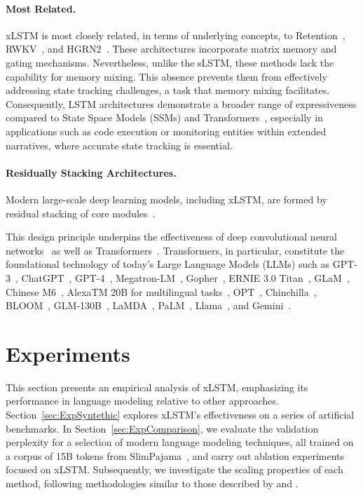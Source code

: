 \paragraph{Most Related.} xLSTM is most closely related, in terms of underlying concepts, to Retention~\citep{Sun:23arxiv}, RWKV~\citep{Peng:23arxivshort,Peng:24arxivshort}, and HGRN2~\citep{Qin:24arxiv}. These architectures incorporate matrix memory and gating mechanisms. Nevertheless, unlike the sLSTM, these methods lack the capability for memory mixing. This absence prevents them from effectively addressing state tracking challenges, a task that memory mixing facilitates. Consequently, LSTM architectures demonstrate a broader range of expressiveness compared to State Space Models (SSMs) and Transformers~\citep{Merrill:24,Deletang:23}, especially in applications such as code execution or monitoring entities within extended narratives, where accurate state tracking is essential.

\paragraph{Residually Stacking Architectures.} Modern large-scale deep learning models, including xLSTM, are formed by residual stacking of core modules~\citep{Srivastava:15,He:16}.

This design principle underpins the effectiveness of deep convolutional neural networks~\citep{He:16} as well as Transformers~\citep{Vaswani:17}. Transformers, in particular, constitute the foundational technology of today’s Large Language Models (LLMs) such as GPT-3~\citep{Brown:20short}, ChatGPT~\citep{Schulman:22short}, GPT-4~\citep{Achiam:23gpt4short}, Megatron-LM~\citep{Shoeybi:19}, Gopher~\citep{Rae:21short}, ERNIE 3.0 Titan~\citep{Wang:21arxivshort}, GLaM~\citep{Du:21glamshort}, Chinese M6~\citep{Lin:21}, AlexaTM 20B for multilingual tasks~\citep{Soltan:22}, OPT~\citep{Zhang:22opt}, Chinchilla~\citep{Hoffmann:22short}, BLOOM~\citep{Scao:22arxivshort}, GLM-130B~\citep{Zeng:22arxivshort}, LaMDA~\citep{Thoppilan:22short}, PaLM~\citep{Chowdhery:22short}, Llama~\citep{Touvron:23arxiv}, and Gemini~\citep{GeminiTeam:23arxiv,Reid:24arxiv}.

\section{Experiments}
\label{sec:Exp}

This section presents an empirical analysis of xLSTM, emphasizing its performance in language modeling relative to other approaches. Section~\ref{sec:ExpSyntethic} explores xLSTM’s effectiveness on a series of artificial benchmarks. In Section~\ref{sec:ExpComparison}, we evaluate the validation perplexity for a selection of modern language modeling techniques, all trained on a corpus of 15B tokens from SlimPajama~\citep{Soboleva:23}, and carry out ablation experiments focused on xLSTM. Subsequently, we investigate the scaling properties of each method, following methodologies similar to those described by \citet{Kaplan:20} and \citet{Brown:20short}. 

